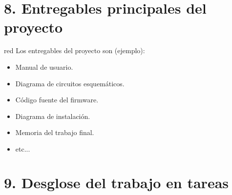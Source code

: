\documentclass[
11pt, %
]{charter}
\begin{document}
\section{8. Entregables principales del proyecto}
\label{sec:entregables}

\begin{consigna}{red}
Los entregables del proyecto son (ejemplo):

\begin{itemize}
	\item Manual de usuario.
	\item Diagrama de circuitos esquemáticos.
	\item Código fuente del firmware.
	\item Diagrama de instalación.
	\item Memoria del trabajo final.
	\item etc...
\end{itemize}
\end{consigna}

\section{9. Desglose del trabajo en tareas}
\label{sec:wbs}
\end{document}
